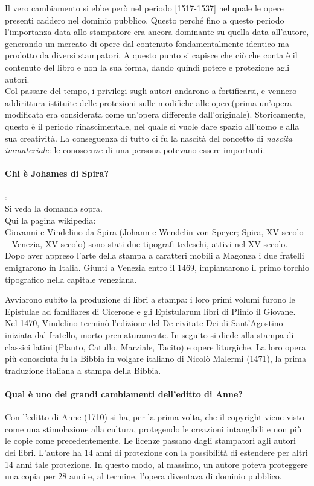 \documentclass[a4paper]{article}
\begin{document}
		Il vero cambiamento si ebbe però nel periodo [1517-1537] nel quale le opere presenti caddero nel dominio pubblico. Questo perché fino a questo periodo l'importanza data allo stampatore era ancora dominante su quella data all'autore, generando un mercato di opere dal contenuto fondamentalmente identico ma prodotto da diversi stampatori. A questo punto si capisce che ciò che conta è il contenuto del libro e non la sua forma, dando quindi potere e protezione agli autori.\\
		Col passare del tempo, i privilegi sugli autori andarono a fortificarsi, e vennero addirittura istituite delle protezioni sulle modifiche alle opere(prima un'opera modificata era considerata come un'opera differente dall'originale).
		Storicamente, questo è il periodo rinascimentale, nel quale si vuole dare spazio all'uomo e alla sua creatività.
		La conseguenza di tutto ci fu la nascità del concetto di \textit{nascita immateriale}: le conoscenze di una persona potevano essere importanti.
		
		\paragraph{Chi è Johames di Spira?}: \\ %
		Si veda la domanda sopra.\\
		Qui la pagina wikipedia:\\
		Giovanni e Vindelino da Spira (Johann e Wendelin von Speyer; Spira, XV secolo – Venezia, XV secolo) sono stati due tipografi tedeschi, attivi nel XV secolo.
		Dopo aver appreso l'arte della stampa a caratteri mobili a Magonza i due fratelli emigrarono in Italia. Giunti a Venezia entro il 1469, impiantarono il primo torchio tipografico nella capitale veneziana.
		
		Avviarono subito la produzione di libri a stampa: i loro primi volumi furono le Epistulae ad familiares di Cicerone e gli Epistularum libri di Plinio il Giovane. Nel 1470, Vindelino terminò l'edizione del De civitate Dei di Sant'Agostino iniziata dal fratello, morto prematuramente. In seguito si diede alla stampa di classici latini (Plauto, Catullo, Marziale, Tacito) e opere liturgiche.
		La loro opera più conosciuta fu la Bibbia in volgare italiano di Nicolò Malermi (1471), la prima traduzione italiana a stampa della Bibbia.
		
		\paragraph{Qual è uno dei grandi cambiamenti dell'editto di Anne?}
		Con l'editto di Anne (1710) si ha, per la prima volta, che il copyright viene visto come una stimolazione alla cultura, protegendo le 
		creazioni intangibili e non più le copie come precedentemente. Le licenze passano dagli stampatori agli autori dei libri. L'autore ha 14 anni di protezione con la possibilità di estendere per altri 14 anni tale protezione. In questo modo, al massimo, un autore poteva proteggere una copia per 28 anni e, al termine, l'opera diventava di dominio pubblico.
	
\end{document}
